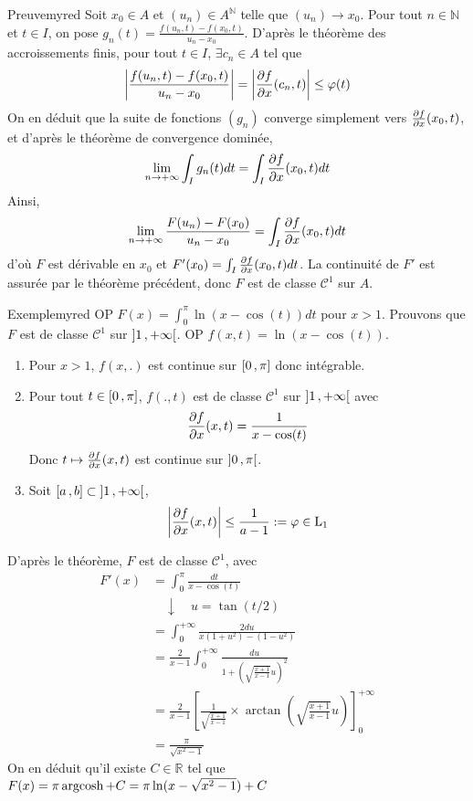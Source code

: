     \begin{demo}{Preuve}{myred}
        Soit $x_0 \in A$ et $(u_n) \in A^{\mathbb{N}}$ telle que $(u_n) \to x_0$. Pour tout $n \in \mathbb{N}$ et $t \in I$, on pose $g_n(t) = \frac{f(u_n,t) - f(x_0,t)}{u_n - x_0}$. D’après le théorème des accroissements finis, pour tout $t \in I$, $\exists c_n \in A$ tel que 
        \[ \left\lvert \frac{f(u_n,t) - f(x_0,t)}{u_n - x_0}\right\rvert = \left\lvert \frac{\partial f}{\partial x}(c_n,t)\right\rvert \leq \varphi(t) \]   
        On en déduit que la suite de fonctions $(g_n)$ converge simplement vers $\frac{\partial f}{\partial x}(x_0,t)$, et d’après le théorème de convergence dominée, 
        \[ \lim_{n \to +\infty} \int_I g_n(t)dt = \int_I \frac{\partial f}{\partial x}(x_0,t)dt \] 
        Ainsi, 
        \[ \lim_{n \to +\infty} \frac{F(u_n) - F(x_0)}{u_n - x_0} = \int_I \frac{\partial f}{\partial x}(x_0,t)dt \] d’où $F$ est dérivable en $x_0$ et $F'(x_0) = \int_I \frac{\partial f}{\partial x}(x_0,t)dt$. La continuité de $F'$ est assurée par le théorème précédent, donc $F$ est de classe $\mathcal{C}^1$ sur $A$.  
    \end{demo}

    \begin{omed}{Exemple}{myred}
        OP $F(x) = \int_{0}^{\pi} \ln(x - \cos(t))dt$ pour $x > 1$. Prouvons que $F$ est de classe $\mathcal{C}^1$ sur $\left] 1 \, , +\infty \right[$. OP $f(x,t) = \ln(x - \cos(t))$.
        \begin{enumerate}
            \item Pour $x > 1$, $f(x,.)$ est continue sur $\left[ 0 \, , \pi \right]$ donc intégrable.
            \item Pour tout $t \in \left[ 0 \, , \pi \right]$, $f(.,t)$ est de classe $\mathcal{C}^1$ sur $\left] 1 \, , +\infty \right[$ avec 
            \[ \frac{\partial f}{\partial x}(x,t) = \frac{1}{x - \cos(t)} \]   
            Donc $t \mapsto \frac{\partial f}{\partial x}(x,t)$ est continue sur $\left] 0 \, , \pi \right[$.
            \item Soit $\left[ a \, , b \right] \subset \left] 1 \, , +\infty \right[$, 
            \[ \left\lvert \frac{\partial f}{\partial x}(x,t)\right\rvert \leq \frac{1}{a-1} := \varphi \in \operatorname{L}_1 \]   
        \end{enumerate}
        D’après le théorème, $F$ est de classe $\mathcal{C}^1$, avec 
        \begin{align*}
            F'(x) &= \int_{0}^{\pi} \frac{dt}{x - \cos(t)} \\
            &\quad \downarrow \quad u = \tan(t / 2) \\
            &= \int_{0}^{+\infty} \frac{2 du}{x(1 + u^2) - (1 - u^2)} \\
            &= \frac{2}{x-1} \int_{0}^{+\infty} \frac{du}{1 + \left(\sqrt{\frac{x+1}{x-1}} u\right)^2} \\
            &= \frac{2}{x-1} \left[\frac{1}{\sqrt{\frac{x+1}{x-1}}} \times \arctan\left(\sqrt{\frac{x+1}{x-1}} u\right)\right]^{+\infty}_0 \\
            &= \frac{\pi}{\sqrt{x^2 - 1}}
        \end{align*}
        On en déduit qu’il existe $C \in \mathbb{R}$ tel que $F(x) = \pi \operatorname{argcosh} + C = \pi \ln(x - \sqrt{x^2 - 1}) + C$
    \end{omed}

